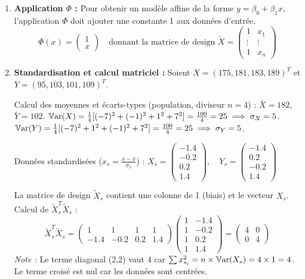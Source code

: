 \documentclass[solutions]{../exercices}
\begin{document}
\begin{solution}
	\begin{enumerate}
		\item \textbf{Application $\Phi$ :}
		Pour obtenir un modèle affine de la forme $y = \beta_0 + \beta_1 x$, l'application $\Phi$ doit ajouter une constante 1 aux données d'entrée.
		\[ \Phi(x) = \begin{pmatrix} 1 \\ x \end{pmatrix} \quad \text{donnant la matrice de design } \tilde{X} = \begin{pmatrix} 1 & x_1 \\ \vdots & \vdots \\ 1 & x_n \end{pmatrix} \]

		\item \textbf{Standardisation et calcul matriciel :}
		Soient $X = (175, 181, 183, 189)^T$ et $Y = (95, 103, 101, 109)^T$.

		Calcul des moyennes et écarts-types (population, diviseur $n=4$) :
		$\bar{X} = 182$, $\bar{Y} = 102$.
		$\mathbb{V}\mathrm{ar}(X) = \frac{1}{4} [(-7)^2 + (-1)^2 + 1^2 + 7^2] = \frac{100}{4} = 25 \implies \sigma_X = 5$.
		$\mathbb{V}\mathrm{ar}(Y) = \frac{1}{4} [(-7)^2 + 1^2 + (-1)^2 + 7^2] = \frac{100}{4} = 25 \implies \sigma_Y = 5$.

		Données standardisées ($x_s = \frac{x - \bar{x}}{\sigma_x}$) :
		$X_s = \begin{pmatrix} -1.4 \\ -0.2 \\ 0.2 \\ 1.4 \end{pmatrix}, \quad Y_s = \begin{pmatrix} -1.4 \\ 0.2 \\ -0.2 \\ 1.4 \end{pmatrix}$

		La matrice de design $\tilde{X}_s$ contient une colonne de 1 (biais) et le vecteur $X_s$.
		Calcul de $\tilde{X}_s^T \tilde{X}_s$ :
		\[ \tilde{X}_s^T \tilde{X}_s = \begin{pmatrix} 1 & 1 & 1 & 1 \\ -1.4 & -0.2 & 0.2 & 1.4 \end{pmatrix} \begin{pmatrix} 1 & -1.4 \\ 1 & -0.2 \\ 1 & 0.2 \\ 1 & 1.4 \end{pmatrix} = \begin{pmatrix} 4 & 0 \\ 0 & 4 \end{pmatrix} \]
		\textit{Note :} Le terme diagonal (2,2) vaut 4 car $\sum x_{s_i}^2 = n \times \mathbb{V}\mathrm{ar}(X_s) = 4 \times 1 = 4$. Le terme croisé est nul car les données sont centrées.


\end{enumerate}
\end{solution}
\end{document}
